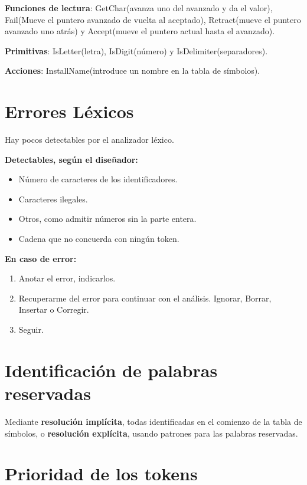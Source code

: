 \documentclass[12pt]{report} %
\begin{document}
\textbf{Funciones de lectura}: GetChar(avanza uno del avanzado y da el
valor), Fail(Mueve el puntero avanzado de vuelta al aceptado),
Retract(mueve el puntero avanzado uno atrás) y Accept(mueve el puntero
actual hasta el avanzado).

\textbf{Primitivas}: IsLetter(letra), IsDigit(número) y
IsDelimiter(separadores).

\textbf{Acciones}: InstallName(introduce un nombre en la tabla de
símbolos).


\section{Errores Léxicos}

Hay pocos detectables por el analizador léxico.

\textbf{Detectables, según el diseñador:}

\begin{itemize}

\item
  Número de caracteres de los identificadores.
\item
  Caracteres ilegales.
\item
  Otros, como admitir números sin la parte entera.
\item
  Cadena que no concuerda con ningún token.
\end{itemize}

\textbf{En caso de error:}

\begin{enumerate}
\def\labelenumi{\arabic{enumi}.}

\item
  Anotar el error, indicarlos.
\item
  Recuperarme del error para continuar con el análisis. Ignorar, Borrar,
  Insertar o Corregir.
\item
  Seguir.
\end{enumerate}


\section{Identificación de palabras reservadas}

Mediante \textbf{resolución implícita}, todas identificadas en el
comienzo de la tabla de símbolos, o \textbf{resolución explícita},
usando patrones para las palabras reservadas.


\section{Prioridad de los tokens}
\end{document}

